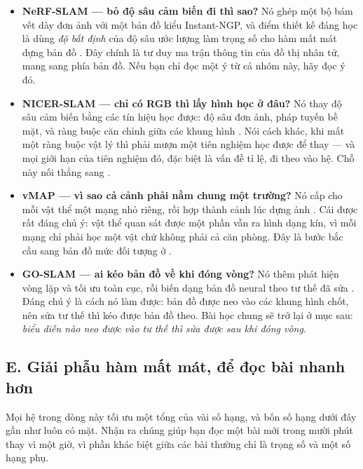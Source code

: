 \documentclass[../../deep_learning.tex]{subfiles}
\begin{document}
\begin{itemize}
\item \textbf{NeRF-SLAM --- bỏ độ sâu cảm biến đi thì sao?} Nó ghép một bộ bám vết dày đơn ảnh với một bản đồ kiểu Instant-NGP, và điểm thiết kế đáng học là dùng \emph{độ bất định} của độ sâu ước lượng làm trọng số cho hàm mất mát dựng bản đồ \cite{f32nerfslam2022}. Đây chính là tư duy ma trận thông tin của đồ thị nhân tử, mang sang phía bản đồ. Nếu bạn chỉ đọc một ý từ cả nhóm này, hãy đọc ý đó.
\item \textbf{NICER-SLAM --- chỉ có RGB thì lấy hình học ở đâu?} Nó thay độ sâu cảm biến bằng các tín hiệu học được: độ sâu đơn ảnh, pháp tuyến bề mặt, và ràng buộc căn chỉnh giữa các khung hình \cite{f32nicerslam2024}. Nói cách khác, khi mất một ràng buộc vật lý thì phải mượn một tiên nghiệm học được để thay --- và mọi giới hạn của tiên nghiệm đó, đặc biệt là vấn đề tỉ lệ, đi theo vào hệ. Chỗ này nối thẳng sang .
\item \textbf{vMAP --- vì sao cả cảnh phải nằm chung một trường?} Nó cấp cho mỗi vật thể một mạng nhỏ riêng, rồi hợp thành cảnh lúc dựng ảnh \cite{f32vmap2023}. Cái được rất đáng chú ý: vật thể quan sát được một phần vẫn ra hình dạng kín, vì mỗi mạng chỉ phải học một vật chứ không phải cả căn phòng. Đây là bước bắc cầu sang bản đồ mức đối tượng ở .
\item \textbf{GO-SLAM --- ai kéo bản đồ về khi đóng vòng?} Nó thêm phát hiện vòng lặp và tối ưu toàn cục, rồi biến dạng bản đồ neural theo tư thế đã sửa \cite{f32goslam2023}. Đáng chú ý là cách nó làm được: bản đồ được neo vào các khung hình chốt, nên sửa tư thế thì kéo được bản đồ theo. Bài học chung sẽ trở lại ở mục sau: \emph{biểu diễn nào neo được vào tư thế thì sửa được sau khi đóng vòng}.
\end{itemize}

\subsection{E. Giải phẫu hàm mất mát, để đọc bài nhanh hơn}
Mọi hệ trong dòng này tối ưu một tổng của vài số hạng, và bốn số hạng dưới đây gần như luôn có mặt. Nhận ra chúng giúp bạn đọc một bài mới trong mười phút thay vì một giờ, vì phần khác biệt giữa các bài thường chỉ là trọng số và một số hạng phụ.
\end{document}
